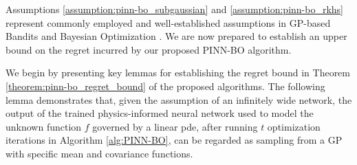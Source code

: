 Assumptions \ref{assumption:pinn-bo_subgaussian} and \ref{assumption:pinn-bo_rkhs} represent commonly employed and well-established assumptions in GP-based Bandits and Bayesian Optimization \citep{chowdhury2017kernelized,vakili2021optimal}. We are now prepared to establish an upper bound on the regret incurred by our proposed PINN-BO algorithm.  

We begin by presenting key lemmas for establishing the regret bound in Theorem \ref{theorem:pinn-bo_regret_bound} of the proposed algorithms. The following lemma demonstrates that, given the assumption of an infinitely wide network, the output of the trained physics-informed neural network used to model the unknown function $f$ governed by a linear \ac{pde}, after running $t$ optimization iterations in Algorithm \ref{alg:PINN-BO}, can be regarded as sampling from a GP with specific mean and covariance functions.
